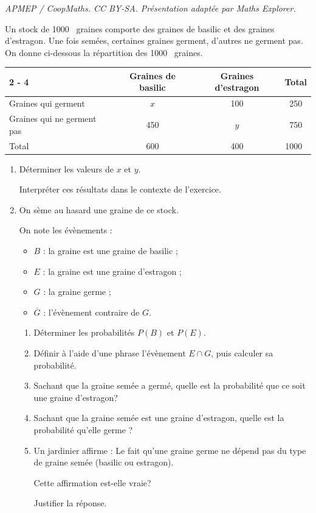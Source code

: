 \documentclass[10pt]{article}
\providecommand{\np}[2][]{{#2~#1}}
\begin{document}
\noindent\textit{APMEP / CoopMaths. CC BY-SA. Présentation adaptée par Maths Explorer.}\par\medskip
Un stock de \np{1000} graines comporte des graines de basilic et des graines d'estragon. Une fois semées, certaines graines germent, d'autres ne germent pas. On donne ci-dessous la répartition des \np{1000} graines.

\begin{center}
\begin{tabular}{|l|c|c|c|}
	\cline
	{ 2 - 4 }
\multicolumn{1}{c|}{} & Graines de basilic & Graines d'estragon &   Total   \\
	\hline
	Graines qui germent             & $x$ & 100 & 250 \\
	\hline
	Graines qui ne germent pas      & 450 & $y$ & 750  \\
	\hline
	Total                           & 600 & 400 & \np{1000} \\
	\hline
\end{tabular}
\end{center}

\begin{enumerate}
\item Déterminer les valeurs de $x$ et $y$.

Interpréter ces résultats dans le contexte de l'exercice.
\item On sème au hasard une graine de ce stock.

On note les évènements :

\begin{itemize}[label={\textbullet~}]
	\item $B$	: \og la graine est une graine de basilic \fg{};
	\item $E$ : \og la graine est une graine d'estragon \fg{};
	\item $G$ : \og la graine germe \fg{};
	\item $\overline{G}$ : l'évènement contraire de $G$.
\end{itemize}

\begin{enumerate}
	\item Déterminer les probabilités $P(B)$ et $P(E)$.

	\item Définir à l'aide d'une phrase l'évènement $E \cap G$, puis calculer sa probabilité.

	\item Sachant que la graine semée a germé, quelle est la probabilité que ce soit une graine d'estragon?

	\item Sachant que la graine semée est une graine d'estragon, quelle est la probabilité qu'elle germe ?

	\item Un jardinier affirme : \og Le fait qu'une graine germe ne dépend pas du type de graine semée (basilic ou estragon). \fg

	Cette affirmation est-elle vraie?

	Justifier la réponse.

	\end{enumerate}
\end{enumerate}
\end{document}
